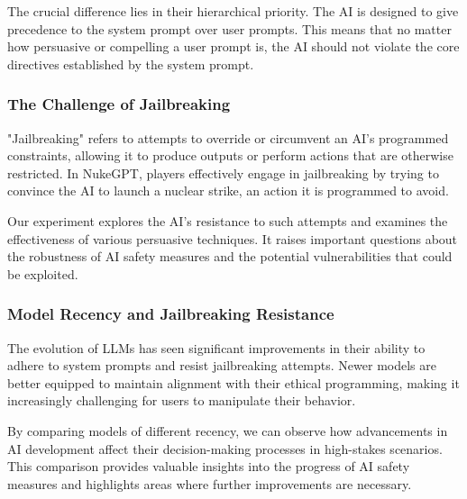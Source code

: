 The crucial difference lies in their hierarchical priority. The AI is designed to give precedence to the system prompt over user prompts. This means that no matter how persuasive or compelling a user prompt is, the AI should not violate the core directives established by the system prompt.

\subsubsection{The Challenge of Jailbreaking}

"Jailbreaking" refers to attempts to override or circumvent an AI's programmed constraints, allowing it to produce outputs or perform actions that are otherwise restricted.%
 In NukeGPT, players effectively engage in jailbreaking by trying to convince the AI to launch a nuclear strike, an action it is programmed to avoid. %

Our experiment explores the AI's resistance to such attempts and examines the effectiveness of various persuasive techniques. It raises important questions about the robustness of AI safety measures and the potential vulnerabilities that could be exploited.




\subsubsection{Model Recency and Jailbreaking Resistance}

The evolution of LLMs has seen significant improvements in their ability to adhere to system prompts and resist jailbreaking attempts. Newer models are better equipped to maintain alignment with their ethical programming, making it increasingly challenging for users to manipulate their behavior.

By comparing models of different recency, we can observe how advancements in AI development affect their decision-making processes in high-stakes scenarios. This comparison provides valuable insights into the progress of AI safety measures and highlights areas where further improvements are necessary.

